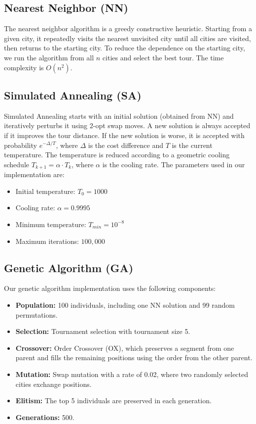 \documentclass[conference]{IEEEtran}
\begin{document}
\subsection{Nearest Neighbor (NN)}
The nearest neighbor algorithm is a greedy constructive heuristic. Starting from a given city, it repeatedly visits the nearest unvisited city until all cities are visited, then returns to the starting city. To reduce the dependence on the starting city, we run the algorithm from all $n$ cities and select the best tour. The time complexity is $O(n^2)$.

\subsection{Simulated Annealing (SA)}
Simulated Annealing starts with an initial solution (obtained from NN) and iteratively perturbs it using 2-opt swap moves. A new solution is always accepted if it improves the tour distance. If the new solution is worse, it is accepted with probability $e^{-\Delta / T}$, where $\Delta$ is the cost difference and $T$ is the current temperature. The temperature is reduced according to a geometric cooling schedule $T_{k+1} = \alpha \cdot T_k$, where $\alpha$ is the cooling rate. The parameters used in our implementation are:

\begin{itemize}
    \item Initial temperature: $T_0 = 1000$
    \item Cooling rate: $\alpha = 0.9995$
    \item Minimum temperature: $T_{min} = 10^{-8}$
    \item Maximum iterations: $100{,}000$
\end{itemize}

\subsection{Genetic Algorithm (GA)}
Our genetic algorithm implementation uses the following components:

\begin{itemize}
    \item \textbf{Population:} 100 individuals, including one NN solution and 99 random permutations.
    \item \textbf{Selection:} Tournament selection with tournament size 5.
    \item \textbf{Crossover:} Order Crossover (OX), which preserves a segment from one parent and fills the remaining positions using the order from the other parent.
    \item \textbf{Mutation:} Swap mutation with a rate of 0.02, where two randomly selected cities exchange positions.
    \item \textbf{Elitism:} The top 5 individuals are preserved in each generation.
    \item \textbf{Generations:} 500.
\end{itemize}
\end{document}
